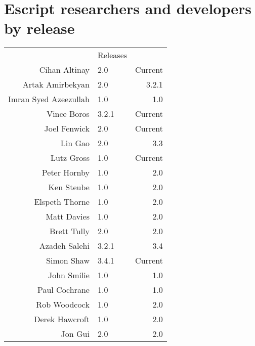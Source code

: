 
\chapter{Escript researchers and developers by release}

\begin{center}
\begin{tabular}{r|lr|}
& Releases\\ \cline{2-3}
Cihan Altinay & 2.0 & Current \\
Artak Amirbekyan & 2.0 & 3.2.1 \\
Imran Syed Azeezullah & 1.0 & 1.0 \\
Vince Boros & 3.2.1 & Current \\
Joel Fenwick & 2.0 & Current \\
Lin Gao & 2.0 & 3.3 \\
Lutz Gross & 1.0 & Current \\
Peter Hornby & 1.0 & 2.0 \\
Ken Steube & 1.0 & 2.0 \\
Elspeth Thorne & 1.0 & 2.0 \\
Matt Davies & 1.0 & 2.0 \\
Brett Tully & 2.0 & 2.0 \\
Azadeh Salehi & 3.2.1 & 3.4 \\
Simon Shaw & 3.4.1 & Current \\
John Smilie & 1.0 & 1.0 \\
Paul Cochrane & 1.0 & 1.0 \\
Rob Woodcock & 1.0 & 2.0 \\
Derek Hawcroft & 1.0 & 2.0 \\
Jon Gui & 2.0 & 2.0 \\
\cline{2-3}
\end{tabular}
\end{center}
